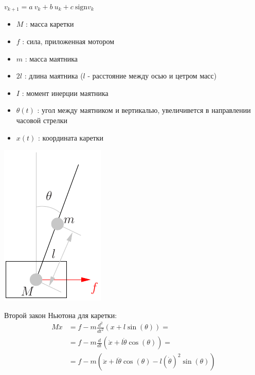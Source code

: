 \documentclass{article}
\newcommand{\sign}{\text{sign}}
\begin{document}
\thispagestyle{empty}

$v_{k+1} = a~v_k + b~u_k +c~\sign{v_k}$



\begin{itemize}
\item $M$ : масса каретки %
\item $f$ : сила, приложенная мотором %
\item $m$ : масса маятника %
\item $2l$ : длина маятника ($l$ - расстояние между осью и цетром масс) %
\item $I$ : момент инерции маятника %
\item $\theta(t)$ : угол между маятником и вертикалью, увеличивется в направлении часовой стрелки %
\item $x(t)$ : координата каретки %
\end{itemize}

\centerline{\includegraphics[width=.3\linewidth]{schema.pdf}}



Второй закон Ньютона для каретки:
\begin{align*}
M\ddot{x} & = f - m\frac{d^2}{dt^2}(x + l\sin(\theta)) = \\
          & = f - m\frac{d}{dt}(\dot{x} + l\dot{\theta}\cos(\theta)) = \\
          & = f - m(\ddot{x} + l\ddot{\theta}\cos(\theta) - l\left(\dot{\theta}\right)^2\sin(\theta))
\end{align*}
\end{document}
